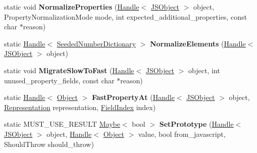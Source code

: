 \begin{DoxyCompactItemize}
\item 
static void {\bfseries Normalize\+Properties} (\hyperlink{classv8_1_1internal_1_1_handle}{Handle}$<$ \hyperlink{classv8_1_1internal_1_1_j_s_object}{J\+S\+Object} $>$ object, Property\+Normalization\+Mode mode, int expected\+\_\+additional\+\_\+properties, const char $\ast$reason)\hypertarget{classv8_1_1internal_1_1_j_s_object_a5026b2a0ec46caabc4122ea7010608e4}{}\label{classv8_1_1internal_1_1_j_s_object_a5026b2a0ec46caabc4122ea7010608e4}

\item 
static \hyperlink{classv8_1_1internal_1_1_handle}{Handle}$<$ \hyperlink{classv8_1_1internal_1_1_seeded_number_dictionary}{Seeded\+Number\+Dictionary} $>$ {\bfseries Normalize\+Elements} (\hyperlink{classv8_1_1internal_1_1_handle}{Handle}$<$ \hyperlink{classv8_1_1internal_1_1_j_s_object}{J\+S\+Object} $>$ object)\hypertarget{classv8_1_1internal_1_1_j_s_object_ae2dffe7e7a583b86eaeb32c490c9cbbe}{}\label{classv8_1_1internal_1_1_j_s_object_ae2dffe7e7a583b86eaeb32c490c9cbbe}

\item 
static void {\bfseries Migrate\+Slow\+To\+Fast} (\hyperlink{classv8_1_1internal_1_1_handle}{Handle}$<$ \hyperlink{classv8_1_1internal_1_1_j_s_object}{J\+S\+Object} $>$ object, int unused\+\_\+property\+\_\+fields, const char $\ast$reason)\hypertarget{classv8_1_1internal_1_1_j_s_object_a663c5f054f780e77e595402eef1c4d1e}{}\label{classv8_1_1internal_1_1_j_s_object_a663c5f054f780e77e595402eef1c4d1e}

\item 
static \hyperlink{classv8_1_1internal_1_1_handle}{Handle}$<$ \hyperlink{classv8_1_1internal_1_1_object}{Object} $>$ {\bfseries Fast\+Property\+At} (\hyperlink{classv8_1_1internal_1_1_handle}{Handle}$<$ \hyperlink{classv8_1_1internal_1_1_j_s_object}{J\+S\+Object} $>$ object, \hyperlink{classv8_1_1internal_1_1_representation}{Representation} representation, \hyperlink{classv8_1_1internal_1_1_field_index}{Field\+Index} index)\hypertarget{classv8_1_1internal_1_1_j_s_object_a6eb754b8c258aa12505635627566fa22}{}\label{classv8_1_1internal_1_1_j_s_object_a6eb754b8c258aa12505635627566fa22}

\item 
static M\+U\+S\+T\+\_\+\+U\+S\+E\+\_\+\+R\+E\+S\+U\+LT \hyperlink{classv8_1_1_maybe}{Maybe}$<$ bool $>$ {\bfseries Set\+Prototype} (\hyperlink{classv8_1_1internal_1_1_handle}{Handle}$<$ \hyperlink{classv8_1_1internal_1_1_j_s_object}{J\+S\+Object} $>$ object, \hyperlink{classv8_1_1internal_1_1_handle}{Handle}$<$ \hyperlink{classv8_1_1internal_1_1_object}{Object} $>$ value, bool from\+\_\+javascript, Should\+Throw should\+\_\+throw)\hypertarget{classv8_1_1internal_1_1_j_s_object_a7019b0abb25e7f2d61b70947e000d9e7}{}\label{classv8_1_1internal_1_1_j_s_object_a7019b0abb25e7f2d61b70947e000d9e7}


\end{DoxyCompactItemize}
